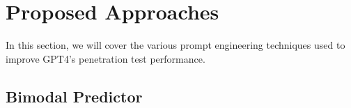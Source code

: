 \documentclass[conference]{IEEEtran}
\begin{document}
\section{Proposed Approaches} \label{sec:approaches}
In this section, we will cover the various prompt engineering techniques used to improve GPT4's penetration test performance.

\subsection{Bimodal Predictor} \label{ssec:bimodal}





\vspace{12pt}
\end{document}
